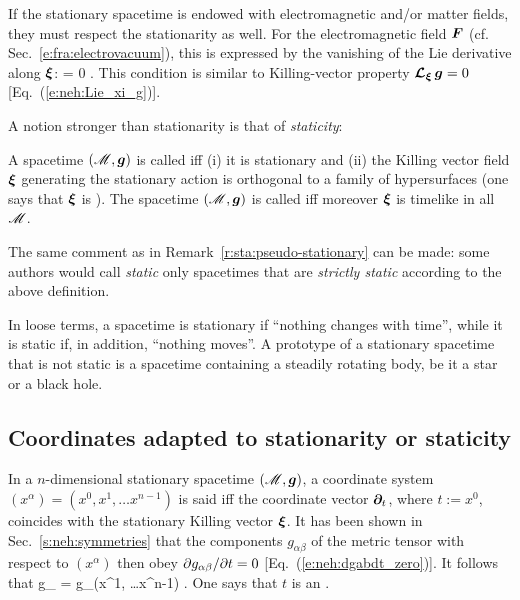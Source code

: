 If the stationary spacetime is endowed with electromagnetic and/or
matter fields, they must respect the stationarity as well. For the electromagnetic
field $\bm{F}$ (cf. Sec.~\ref{e:fra:electrovacuum}), this is expressed by
the vanishing of the Lie derivative along $\bm{\xi}$:
\be
    \Lie{\xi}  = 0 .
\ee
This condition is similar to Killing-vector property
$\bm{\mathcal{L}}_{\bm{\xi}}\, \bm{g} = 0$ [Eq.~(\ref{e:neh:Lie_xi_g})].

A notion stronger than stationarity is that of \emph{staticity}:

\begin{greybox}
A spacetime $(\mathscr{M},\bm{g})$ is called 
iff (i) it is stationary and (ii) the Killing vector field $\bm{\xi}$
generating the stationary action is orthogonal to a family of hypersurfaces
(one says that $\bm{\xi}$ is ).
The spacetime $(\mathscr{M},\bm{g})$ is called 
iff moreover $\bm{\xi}$ is timelike in all $\mathscr{M}$.
\end{greybox}

\begin{remark}
The same comment as in Remark~\ref{r:sta:pseudo-stationary} can be made: some authors
would call \emph{static} only spacetimes that are
\emph{strictly static} according to the above definition.
\end{remark}

In loose terms, a spacetime is stationary if ``nothing changes with time'', while
it is static if, in addition, ``nothing moves''. A prototype of a stationary
spacetime that is not static is a spacetime containing a steadily rotating
body, be it a star or a black hole.


\subsection{Coordinates adapted to stationarity or staticity}

In a $n$-dimensional stationary spacetime $(\mathscr{M},\bm{g})$, a coordinate system $(x^\alpha) = (x^0, x^1, \ldots  x^{n-1})$
is said  iff the coordinate vector
$\bm{\partial}_t$, where $t := x^0$, coincides with the stationary Killing vector $\bm{\xi}$.
It has been shown in Sec.~\ref{s:neh:symmetries} that the components $g_{\alpha\beta}$
of the metric tensor with respect to $(x^\alpha)$ then obey ${\partial g_{\alpha\beta}}/{\partial t} = 0$
[Eq.~(\ref{e:neh:dgabdt_zero})]. It follows that
\be
   g_{\alpha\beta}  = g_{\alpha\beta}(x^1, \ldots  x^{n-1}) .
\ee
One says that $t$ is an .


